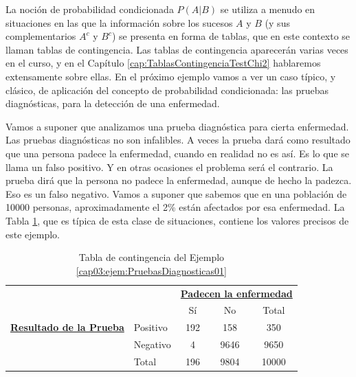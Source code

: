    La noción de probabilidad condicionada $P(A|B)$ se utiliza a menudo en situaciones en las que la información sobre los sucesos $A$ y $B$ (y sus complementarios $A^c$ y $B^c$) se presenta en forma de tablas, que en este contexto se llaman {\sf tablas de contingencia}. Las tablas de contingencia aparecerán varias veces en el curso, y en el Capítulo \ref{cap:TablasContingenciaTestChi2} hablaremos extensamente sobre ellas. En el próximo ejemplo vamos a ver un caso típico, y clásico, de aplicación del concepto de probabilidad condicionada: las {\sf pruebas diagnósticas}, para la detección de una enfermedad.
\begin{ejemplo}
\label{cap03:ejem:PruebasDiagnosticas01}
           Vamos a suponer que analizamos una prueba diagnóstica para cierta enfermedad. Las pruebas diagnósticas no son infalibles. A veces la prueba dará como resultado que una persona padece la enfermedad, cuando en realidad no es así. Es lo que se llama un {\sf falso positivo}. Y en otras ocasiones el problema será el contrario. La prueba dirá que la persona no padece la enfermedad, aunque de hecho la padezca. Eso es un {\sf falso negativo}. Vamos a suponer que sabemos que en una población de 10000 personas, aproximadamente el 2\% están afectados por esa enfermedad. La Tabla \ref{cap03:tabla:ejemploPruebasDiagnosticas}, que es típica de esta clase de situaciones, contiene los valores precisos de este ejemplo.
        \begin{table}[h!]
        \begin{center}
            \begin{tabular}{llccc}
            &&\multicolumn{3}{c}{\underline{\bf Padecen la enfermedad}}\\

                                      &          & Sí &  No & Total\\
            \hline
          \underline{\bf Resultado de la Prueba} & Positivo & 192&  158&   350\\
                                      & Negativo &  4 & 9646&  9650\\
            \hline
                                      & Total    & 196& 9804& 10000\\
            \hline
            \end{tabular}
        \end{center}
        \caption{Tabla de contingencia del Ejemplo \ref{cap03:ejem:PruebasDiagnosticas01}}
        \label{cap03:tabla:ejemploPruebasDiagnosticas}
        \end{table}


\end{ejemplo}
